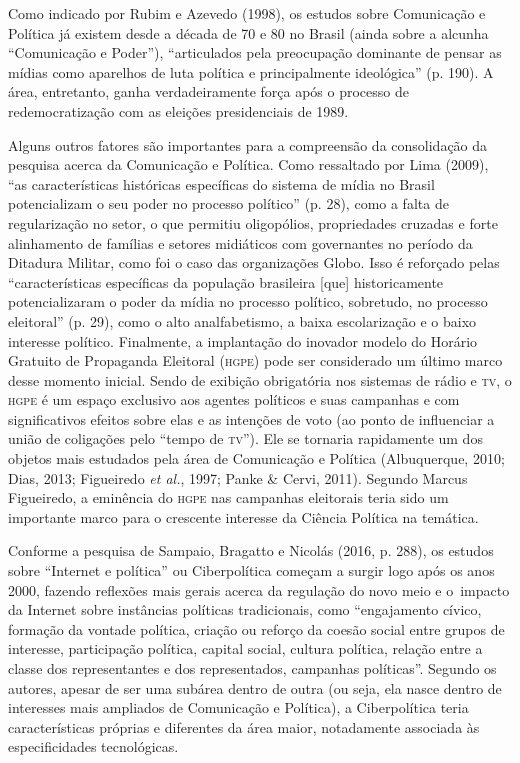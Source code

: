 Como indicado por Rubim e Azevedo (1998), os estudos sobre Comunicação e
Política já existem desde a década de 70 e 80 no Brasil (ainda sobre a
alcunha ``Comunicação e Poder''), ``articulados pela preocupação
dominante de pensar as mídias como aparelhos de luta política e
principalmente ideológica'' (p. 190). A área, entretanto, ganha
verdadeiramente força após o processo de redemocratização com as
eleições presidenciais de 1989.

Alguns outros fatores são importantes para a compreensão da consolidação
da pesquisa acerca da Comunicação e Política. Como ressaltado por Lima
(2009), ``as características históricas específicas do sistema de mídia
no Brasil potencializam o seu poder no processo político'' (p. 28), como
a falta de regularização no setor, o que permitiu oligopólios,
propriedades cruzadas e forte alinhamento de famílias e setores
midiáticos com governantes no período da Ditadura Militar, como foi o
caso das organizações Globo. Isso é reforçado pelas ``características
específicas da população brasileira {[}que{]} historicamente
potencializaram o poder da mídia no processo político, sobretudo, no
processo eleitoral'' (p. 29), como o alto analfabetismo, a baixa
escolarização e o baixo interesse político. Finalmente, a implantação do
inovador modelo do Horário Gratuito de Propaganda Eleitoral (\textsc{hgpe}) pode
ser considerado um último marco desse momento inicial. Sendo de exibição
obrigatória nos sistemas de rádio e \textsc{tv}, o \textsc{hgpe} é um espaço exclusivo aos
agentes políticos e suas campanhas e com significativos efeitos sobre
elas e as intenções de voto (ao ponto de influenciar a união de
coligações pelo ``tempo de \textsc{tv}''). Ele se tornaria rapidamente um dos
objetos mais estudados pela área de Comunicação e Política (Albuquerque,
2010; Dias, 2013; Figueiredo \emph{et al.}, 1997; Panke \& Cervi, 2011).
Segundo Marcus Figueiredo, a eminência do \textsc{hgpe} nas campanhas eleitorais
teria sido um importante marco para o crescente interesse da Ciência
Política na temática.

Conforme a pesquisa de Sampaio, Bragatto e Nicolás (2016, p. 288), os
estudos sobre ``Internet e política'' ou Ciberpolítica começam a surgir
logo após os anos 2000, fazendo reflexões mais gerais acerca da
regulação do novo meio e o~impacto da Internet sobre instâncias
políticas tradicionais, como ``engajamento cívico, formação da vontade
política, criação ou reforço da coesão social entre grupos de interesse,
participação política, capital social, cultura política, relação entre a
classe dos representantes e dos representados, campanhas políticas''.
Segundo os autores, apesar de ser uma subárea dentro de outra (ou seja,
ela nasce dentro de interesses mais ampliados de Comunicação e
Política), a Ciberpolítica teria características próprias e diferentes
da área maior, notadamente associada às especificidades tecnológicas.

